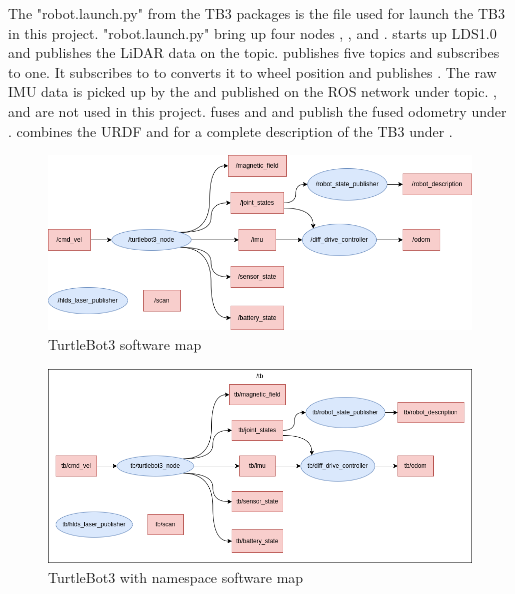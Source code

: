 The "robot.launch.py" from the TB3 packages is the file used for launch the TB3 in this project. "robot.launch.py" bring up four nodes , ,  and . 
 starts up LDS1.0 and publishes the LiDAR data on the  topic.  publishes five topics and subscribes to one. It subscribes to to  converts it to wheel position and publishes . The raw IMU data is picked up by the  and published on the ROS network under  topic. ,  and  are not used in this project. 
 fuses  and  and publish the fused odometry under . 
 combines the URDF and  for a complete description of the TB3 under .

\begin{figure}[H]
    \centering
    \includegraphics[width = 1\textwidth]{Figures/drawio/TB3_rqt.drawio.png}
    \caption{TurtleBot3 software map}
    \label{fig:TB3SW}
\end{figure}
\begin{figure}[H]
    \centering
    \includegraphics[width = 1\textwidth]{Figures/drawio/TB3_ns_rqt.drawio.png}
    \caption{TurtleBot3 with namespace software map}
    \label{fig:TB3nsSW}
\end{figure}

